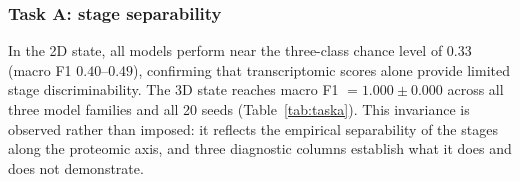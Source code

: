 \documentclass[5p,times,twocolumn]{elsarticle}
\begin{document}
\subsubsection{Task A: stage separability}

In the 2D state, all models perform near the three-class chance
level of 0.33 (macro F1 $0.40$--$0.49$), confirming that
transcriptomic scores alone provide limited stage
discriminability.
The 3D state reaches macro F1 $= 1.000 \pm 0.000$ across all
three model families and all 20 seeds (Table~\ref{tab:taska}).
This invariance is observed rather than imposed: it reflects the
empirical separability of the stages along the proteomic axis,
and three diagnostic columns establish what it does and does not
demonstrate.


\begin{table}[!htbp]
\caption{%
  Task B --- trajectory prediction
  $[\mathbf{s}_{11}, \mathbf{s}_{30}] \to \mathbf{s}_{52}$,
  overall MAE.
  Mean $\pm$ std across 20 seeds; $\Delta$\% is the paired mean
  relative MAE change (negative $\Rightarrow$ 3D improves).
  One-sided paired Wilcoxon signed-rank ($3\text{D} < 2\text{D}$)
  with Holm--Bonferroni correction across the three model
  families; Cohen's $d_{z}$ is the paired effect size.
  Lower is better.}
\label{tab:taskb}
\centering
{}
\end{table}
\end{document}
